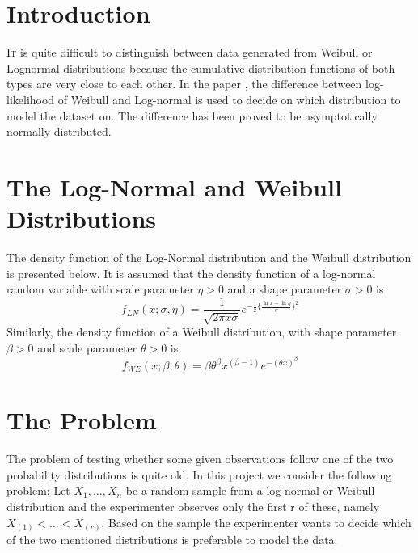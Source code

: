 \documentclass[twoside]{article}
\begin{document}
\begin{multicols}{2} %

\section{Introduction}

\lettrine[nindent=0em,lines=3]{I}t is quite difficult to distinguish between data generated from Weibull or Lognormal distributions because the cumulative distribution functions of both types are very close to each other. In the paper \cite{ad09}, the difference between log-likelihood of Weibull and Log-normal is used to decide on which distribution to model the dataset on. The difference has been proved to be asymptotically normally distributed.
\section{The Log-Normal and Weibull Distributions}
The density function of the Log-Normal distribution and the Weibull distribution is presented below. It is assumed that the density function of a log-normal random variable with scale parameter $\eta >0$ and a shape parameter $\sigma >0$ is 
\begin{equation}
f_{LN}(x;\sigma,\eta)=\frac{1}{\sqrt{2\pi x\sigma}}e^{-\frac{1}{2}\{\frac{\ln x-\ln \eta}{\sigma}\}^{2}}
\end{equation}  
Similarly, the density function of a Weibull distribution, with shape parameter $\beta>0$ and scale parameter $\theta>0$ is
\begin{equation}
f_{WE}(x;\beta,\theta)=\beta\theta^{\beta}x^{(\beta-1)}e^{-(\theta x)^{\beta}}
\end{equation}
\section{The Problem}
The problem of testing whether some given observations follow one of the two probability distributions is quite old. In this project we consider the following problem: Let $X_1,\hdots,X_n$ be a random sample from a log-normal or Weibull distribution and the experimenter observes only the first r of these, namely $X_{(1)}<\hdots<X_{(r)}$. Based on the sample the experimenter wants to decide which of the two mentioned distributions is preferable to model the data.


\end{multicols}
\end{document}
